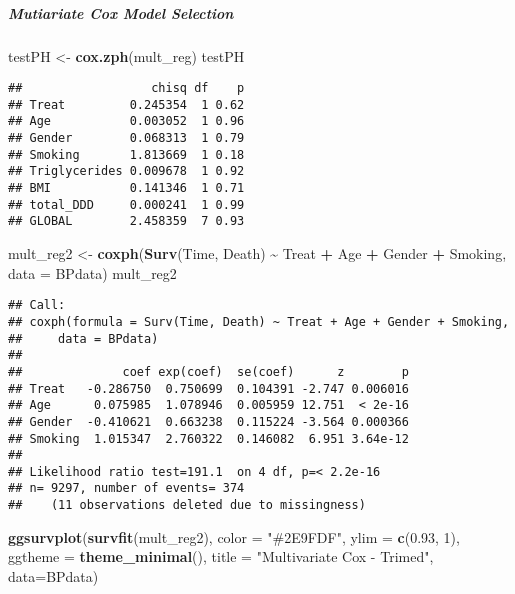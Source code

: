 \documentclass[
]{article}
\newenvironment{Shaded}{\begin{snugshade}}{\end{snugshade}}
\newcommand{\AttributeTok}[1]{\textcolor[rgb]{0.13,0.29,0.53}{#1}}
\newcommand{\DecValTok}[1]{\textcolor[rgb]{0.00,0.00,0.81}{#1}}
\newcommand{\FloatTok}[1]{\textcolor[rgb]{0.00,0.00,0.81}{#1}}
\newcommand{\FunctionTok}[1]{\textcolor[rgb]{0.13,0.29,0.53}{\textbf{#1}}}
\newcommand{\NormalTok}[1]{#1}
\newcommand{\OtherTok}[1]{\textcolor[rgb]{0.56,0.35,0.01}{#1}}
\newcommand{\SpecialCharTok}[1]{\textcolor[rgb]{0.81,0.36,0.00}{\textbf{#1}}}
\newcommand{\StringTok}[1]{\textcolor[rgb]{0.31,0.60,0.02}{#1}}
\begin{document}
\newpage

\subparagraph{Mutiariate Cox Model
Selection}\label{mutiariate-cox-model-selection}

\begin{Shaded}
\begin{Highlighting}[]
\NormalTok{testPH }\OtherTok{\textless{}{-}} \FunctionTok{cox.zph}\NormalTok{(mult\_reg)}
\NormalTok{testPH}
\end{Highlighting}
\end{Shaded}

\begin{verbatim}
##                  chisq df    p
## Treat         0.245354  1 0.62
## Age           0.003052  1 0.96
## Gender        0.068313  1 0.79
## Smoking       1.813669  1 0.18
## Triglycerides 0.009678  1 0.92
## BMI           0.141346  1 0.71
## total_DDD     0.000241  1 0.99
## GLOBAL        2.458359  7 0.93
\end{verbatim}

\begin{Shaded}
\begin{Highlighting}[]
\NormalTok{mult\_reg2 }\OtherTok{\textless{}{-}} \FunctionTok{coxph}\NormalTok{(}\FunctionTok{Surv}\NormalTok{(Time, Death) }\SpecialCharTok{\textasciitilde{}}\NormalTok{ Treat }\SpecialCharTok{+}\NormalTok{ Age }\SpecialCharTok{+}\NormalTok{ Gender }\SpecialCharTok{+}\NormalTok{ Smoking, }\AttributeTok{data =}\NormalTok{ BPdata)}
\NormalTok{mult\_reg2}
\end{Highlighting}
\end{Shaded}

\begin{verbatim}
## Call:
## coxph(formula = Surv(Time, Death) ~ Treat + Age + Gender + Smoking, 
##     data = BPdata)
## 
##              coef exp(coef)  se(coef)      z        p
## Treat   -0.286750  0.750699  0.104391 -2.747 0.006016
## Age      0.075985  1.078946  0.005959 12.751  < 2e-16
## Gender  -0.410621  0.663238  0.115224 -3.564 0.000366
## Smoking  1.015347  2.760322  0.146082  6.951 3.64e-12
## 
## Likelihood ratio test=191.1  on 4 df, p=< 2.2e-16
## n= 9297, number of events= 374 
##    (11 observations deleted due to missingness)
\end{verbatim}

\begin{Shaded}
\begin{Highlighting}[]
\FunctionTok{ggsurvplot}\NormalTok{(}\FunctionTok{survfit}\NormalTok{(mult\_reg2), }\AttributeTok{color =} \StringTok{"\#2E9FDF"}\NormalTok{,}
           \AttributeTok{ylim =} \FunctionTok{c}\NormalTok{(}\FloatTok{0.93}\NormalTok{, }\DecValTok{1}\NormalTok{),}
           \AttributeTok{ggtheme =} \FunctionTok{theme\_minimal}\NormalTok{(), }
           \AttributeTok{title =} \StringTok{"Multivariate Cox {-} Trimed"}\NormalTok{,}
           \AttributeTok{data=}\NormalTok{BPdata)}
\end{Highlighting}
\end{Shaded}
\end{document}
